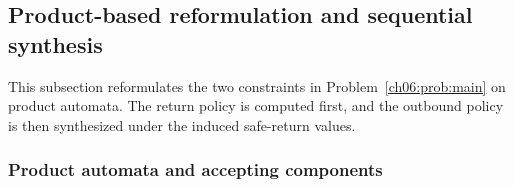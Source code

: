 \subsection{Product-based reformulation and sequential synthesis}
\label{ch06:sec:analysis}

This subsection reformulates the two constraints in
Problem~\ref{ch06:prob:main} on product automata. The return policy is computed
first, and the outbound policy is then synthesized under the induced
safe-return values. 

\subsubsection{Product automata and accepting components}
\label{ch06:subsec:product}

